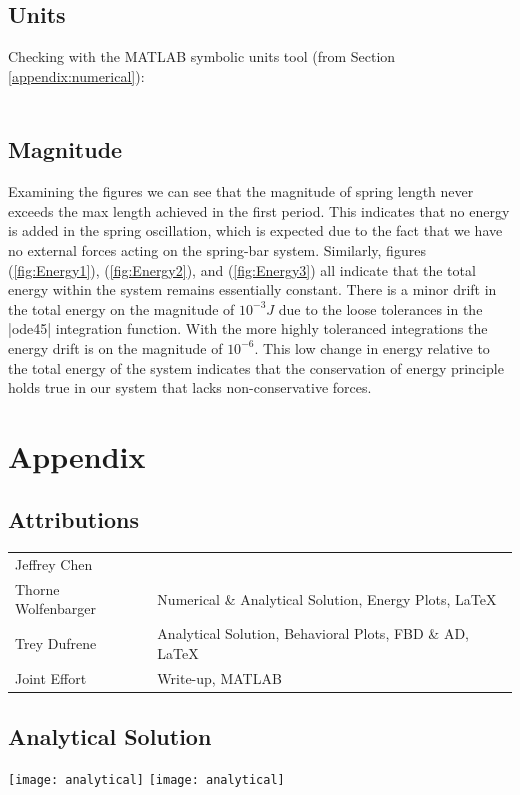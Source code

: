 \documentclass[12pt]{report}
\begin{document}
\begin{flushleft}
\subsection{Units}
Checking with the MATLAB symbolic units tool (from Section \ref{appendix:numerical}): \\
~\\

\subsection{Magnitude}
Examining the figures we can see that the magnitude of spring length never exceeds the max length achieved in the first period. This indicates that no energy is added in the spring oscillation, which is expected due to the fact that we have no external forces acting on the spring-bar system. Similarly, figures
(\ref{fig:Energy1}), (\ref{fig:Energy2}), and (\ref{fig:Energy3}) all indicate that the total energy within the system remains essentially constant. There is a minor drift in the total energy on the magnitude of $10^{-3}J$ due to the loose tolerances in the |ode45| integration function. With the more highly toleranced integrations the energy drift is on the magnitude of $10^{-6}$. This low change in energy relative to the total energy of the system indicates that the conservation of energy principle holds true in our system that lacks non-conservative forces.

\section{Appendix} \label{appendix}
\subsection{Attributions}
\onehalfspacing
\begin{tabular}{ll}
Jeffrey Chen & \\
Thorne Wolfenbarger & Numerical \& Analytical Solution, Energy Plots, \LaTeX \\
Trey Dufrene & Analytical Solution, Behavioral Plots, FBD \& AD, \LaTeX\\
Joint Effort & Write-up, MATLAB
\end{tabular}
\singlespacing
\subsection{Analytical Solution}
\center
\texttt{[image: analytical]}
\newpage
\texttt{[image: analytical]}

\end{flushleft}
\end{document}
